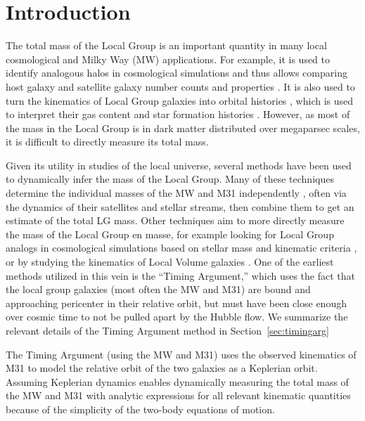 \documentclass[twocolumn]{aastex631}
\begin{document}
\section{Introduction}
\label{sec:intro}
The total mass of the Local Group is an important quantity in many local
cosmological and Milky Way (MW) applications.
For example, it is used to identify analogous halos in cosmological simulations
and thus allows comparing host galaxy and satellite galaxy number counts and
properties \citep[e.g.,][]{Patel2017a, Marinacci:2017, Dooley2017, Besla2018,
Patel2018, Garrison-Kimmel:2019a, Garrison-Kimmel:2019b, Sawala2022}.
It is also used to turn the kinematics of Local Group
galaxies into orbital histories \citep[e.g.,][]{Peebles:2017}, which is used to
interpret their gas content \citep[e.g.,][]{Fillingham:2018,Putman:2021} and
star formation histories \citep[e.g.,][]{Tolstoy:2009}.
However, as most of the mass in the Local Group is in dark matter distributed
over megaparsec scales, it is difficult to directly measure its total mass.

Given its utility in studies of the local universe, several methods have been
used to dynamically infer the mass of the Local Group.
Many of these techniques determine the individual masses of the MW and M31
independently \citep[e.g.][]{Watkins2010, Diaz2014, Patel2018, Eadie:2019,
Fritz:2020, Deason:2021, Wang:2022}, often via the dynamics of their satellites
and stellar streams, then combine them to get an estimate of the total LG mass.
Other techniques aim to more directly measure the mass of the Local Group en
masse, for example looking for Local Group analogs in cosmological simulations
based on stellar mass and kinematic criteria \citep[e.g.,][]{Zhai2020}, or by
studying the kinematics of Local Volume galaxies
\citep[e.g.,][]{Penarrubia2014}.
One of the earliest methods utilized in this vein is the ``Timing Argument,''
which uses the fact that the local group galaxies (most often the MW and M31)
are bound and approaching pericenter in their relative orbit, but must have been
close enough over cosmic time to not be pulled apart by the Hubble flow. We
summarize the relevant details of the Timing Argument method in
Section~\ref{sec:timingarg}

The Timing Argument (using the MW and M31) uses the observed kinematics of M31
to model the relative orbit of the two galaxies as a Keplerian orbit.
Assuming Keplerian dynamics enables dynamically measuring the total mass of the
MW and M31 with analytic expressions for all relevant kinematic quantities
because of the simplicity of the two-body equations of motion.
\end{document}
